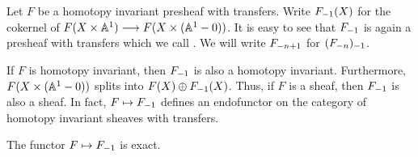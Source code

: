 \begin{defn}\label{def_contract}
Let $F$ be a homotopy invariant presheaf with transfers. Write
$\RHI{F}(X)$ for the cokernel of $F(X \times \A^1) \to F(X \times 
(\A^1 - 0))$. It is easy to see that $\RHI{F}$ is again a presheaf
with transfers which we call . We will 
write $\RHI[n + 1]{F}$ for $\RHI{(\RHI[n]{F})}$.
\end{defn}

If $F$ is homotopy invariant, then $\RHI{F}$ is also a homotopy 
invariant. Furthermore, $F(X \times (\A^1 - 0))$ splits into 
$F(X) \oplus \RHI{F}(X)$. Thus, if $F$ is a sheaf, then $\RHI{F}$ 
is also a sheaf. In fact, $F \mapsto \RHI{F}$ defines an
endofunctor on the category of homotopy invariant sheaves with 
transfers.

\begin{prop}
\label{prop_contract_is_exact}
The functor $F \mapsto \RHI{F}$ is exact.
\end{prop}
